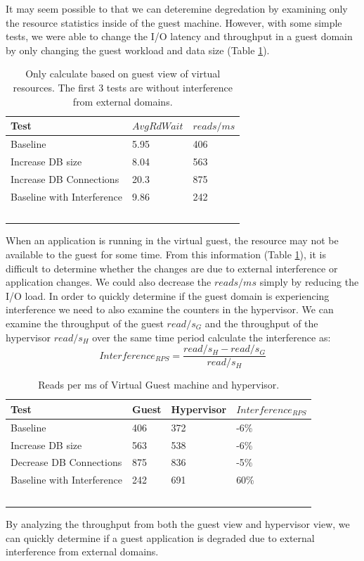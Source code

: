 It may seem possible to that we can deteremine degredation by examining only the resource statistics inside of the guest machine.  However, with some simple tests, we were able to change the I/O latency and throughput in a guest domain by only changing the guest workload and data size (Table \ref{tab:guestOnly}).
 
\begin{table}[h]
  \begin{tabular}{ l l p{10cm} }
    Test & $AvgRdWait$ & $reads/ms$  \\
    \hline
    Baseline                     & 5.95 & 406 \\
    Increase DB size             & 8.04 & 563 \\
    Increase DB Connections      & 20.3 & 875 \\
    Baseline with Interference   & 9.86 & 242 \\
    \hline
  \end{tabular}
\caption{Only calculate based on guest view of virtual resources.  The first 3 tests are without interference from external domains.}
\label{tab:guestOnly}
\end{table}

When an application is running in the virtual guest, the resource may not be available to the guest for some time.  From this information (Table \ref{tab:guestOnly}), it is difficult to determine whether the changes are due to external interference or application changes. We could also decrease the $reads/ms$ simply by reducing the I/O load.  In order to quickly determine if the guest domain is experiencing interference we need to also examine the counters in the hypervisor.  We can examine the throughput of the guest $read/s_G$ and the throughput of the hypervisor $read/s_H$ over the same time period calculate the interference as:
\begin{equation}
	Interference_{RPS} = \frac{read/s_H - read/s_G}{read/s_H} 
\end{equation}

\begin{table}[h]
  \begin{tabular}{ l l l p{6cm} }
    Test & Guest & Hypervisor  & $Interference_{RPS}$ \\
    \hline
    Baseline                     & 406 & 372 & -6\% \\
    Increase DB size             & 563 & 538 & -6\%  \\
    Decrease DB Connections      & 875 & 836 & -5\%  \\
    Baseline with Interference   & 242 & 691 & 60\%  \\
    \hline
  \end{tabular}
\caption{Reads per ms of Virtual Guest machine and hypervisor.}
\label{tab:HypervisorGuest}
\end{table}
By analyzing the throughput from both the guest view and hypervisor view, we can quickly determine if a guest application is degraded due to external interference from external domains.  

